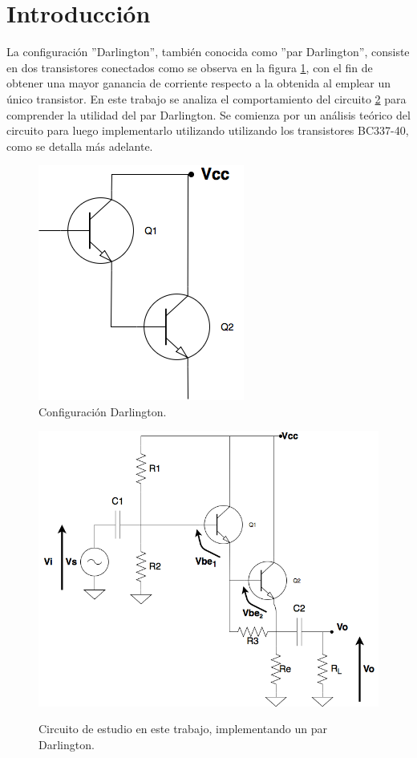\section{Introducci\'on}

La configuraci\'on ''Darlington'', tambi\'en conocida como ''par Darlington'', consiste en dos transistores conectados como se observa en la figura \ref{darlington_ideal}, con el fin de obtener una mayor ganancia de corriente respecto a la obtenida al emplear un \'unico transistor. En este trabajo se analiza el comportamiento del circuito \ref{darlington_tp} para comprender la utilidad del par Darlington. Se comienza por un an\'alisis te\'orico del circuito para luego implementarlo utilizando utilizando los transistores BC337-40, como se detalla m\'as adelante.

\begin{figure}[H]
	\centering
		\includegraphics[scale=0.4]{./Imagenes/darlington_ideal.png} 
	\caption{Configuraci\'on Darlington.}
	\label{darlington_ideal}
\end{figure}

\begin{figure}[H]
	\centering
		\includegraphics[scale=0.4]{./Imagenes/darlington_tp.png} \\
	\caption{Circuito de estudio en este trabajo, implementando un par Darlington.}
	\label{darlington_tp}
\end{figure}

